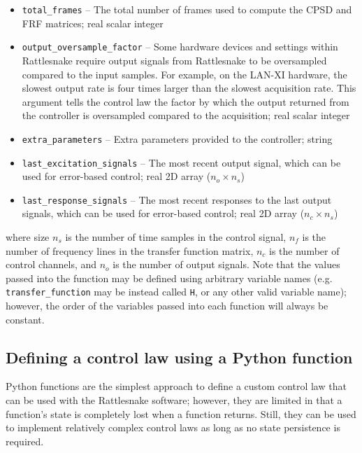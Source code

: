 \documentclass[pdf,12pt,report]{SANDreport}
\newcommand{\inlineCode}{\lstinline[basicstyle=\bfseries\ttfamily]}
\begin{document}
\begin{itemize}
        \item \inlineCode{total_frames} -- The total number of frames used to compute the \Ac{CPSD} and \Ac{FRF} matrices; real scalar integer
        
        \item \inlineCode{output_oversample_factor} -- Some hardware devices and settings within Rattlesnake require output signals from Rattlesnake to be oversampled compared to the input samples.  For example, on the LAN-XI hardware, the slowest output rate is four times larger than the slowest acquisition rate.  This argument tells the control law the factor by which the output returned from the controller is oversampled compared to the acquisition; real scalar integer
        
        \item \inlineCode{extra_parameters} -- Extra parameters provided to the controller; string
        
        \item \inlineCode{last_excitation_signals} -- The most recent output signal, which can be used for error-based control; real 2D array ($n_{o} \times n_{s}$)
        
        \item \inlineCode{last_response_signals} -- The most recent responses to the last output signals, which can be used for error-based control; real 2D array ($n_{c} \times n_{s}$)
    \end{itemize}
    
    where size $n_s$ is the number of time samples in the control signal, $n_f$ is the number of frequency lines in the transfer function matrix, $n_c$ is the number of control channels, and $n_o$ is the number of output signals.  Note that the values passed into the function may be defined using arbitrary variable names (e.g. \inlineCode{transfer_function} may be instead called \inlineCode{H}, or any other valid variable name); however, the order of the variables passed into each function will always be constant.

    \subsection{Defining a control law using a Python function}
    Python functions are the simplest approach to define a custom control law that can be used with the Rattlesnake software; however, they are limited in that a function's state is completely lost when a function returns.  Still, they can be used to implement relatively complex control laws as long as no state persistence is required.
    
\end{document}
